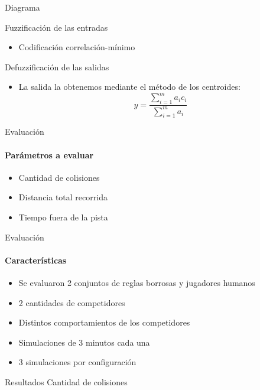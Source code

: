 \documentclass[spanish]{beamer}
\begin{document}
\begin{frame}{Diagrama}
\end{frame}

\begin{frame}{Fuzzificación de las entradas}
  \begin{itemize}
  \item Codificación correlación-mínimo
  \end{itemize}
\end{frame}

\begin{frame}{Defuzzificación de las salidas}
  \begin{itemize}
  \item La salida la obtenemos mediante el método de los centroides:
    \begin{equation*}
      y=\frac{\sum_{i=1}^{m}{a_ic_i}}{\sum_{i=1}^{m}{a_i}}
    \end{equation*}
  \end{itemize}
\end{frame}

\begin{frame}{Evaluación}
\framesubtitle{Parámetros a evaluar}
  \begin{itemize}
  \item Cantidad de colisiones
  \item Distancia total recorrida
  \item Tiempo fuera de la pista
  \end{itemize}
\end{frame}

\begin{frame}{Evaluación}
\framesubtitle{Características}
  \begin{itemize}
  \item Se evaluaron 2 conjuntos de reglas borrosas y jugadores humanos
  \item 2 cantidades de competidores
  \item Distintos comportamientos de los competidores
  \item Simulaciones de 3 minutos cada una
  \item 3 simulaciones por configuración
  \end{itemize}
\end{frame}

\begin{frame}{Resultados}
Cantidad de colisiones

\end{frame}
\end{document}
